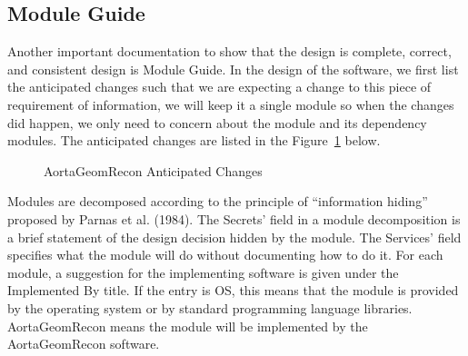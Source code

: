 \subsection{Module Guide}

Another important documentation to show that the design is complete, correct, and consistent design is Module Guide. In the design of the software, we first list the anticipated changes such that we are expecting a change to this piece of requirement of information, we will keep it a single module so when the changes did happen, we only need to concern about the module and its dependency modules. The anticipated changes are listed in the Figure~\ref{fig_agr_ac} below.

\begin{figure}[H]
    \centering
    \caption[AortaGeomRecon Anticipated Changes]{AortaGeomRecon Anticipated Changes}
    \label{fig_agr_ac}
\end{figure}

Modules are decomposed according to the principle of “information hiding” proposed by Parnas et al. (1984). The Secrets' field in a module decomposition is a brief statement of the design decision hidden by the module. The Services' field specifies what the module will do without documenting how to do it. For each module, a suggestion for the implementing software is given under the Implemented By title. If the entry is OS, this means that the module is provided by the operating system or by standard programming language libraries. AortaGeomRecon means the module will be implemented by the AortaGeomRecon software.

